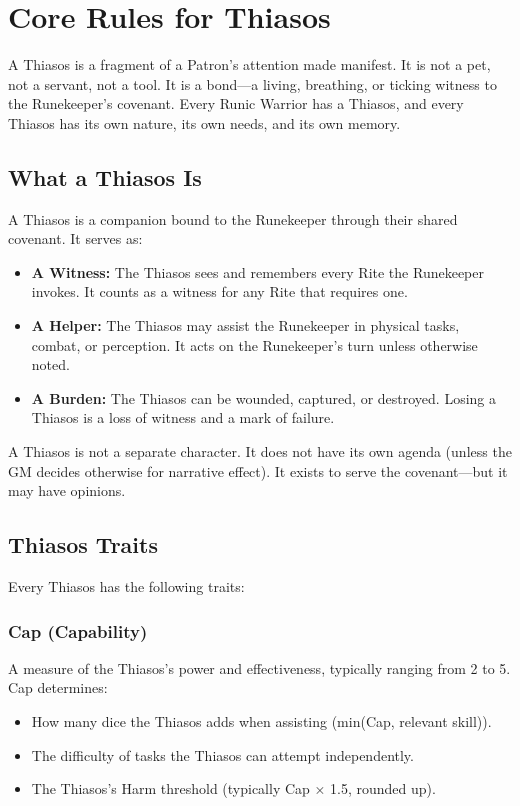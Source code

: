 \section{Core Rules for Thiasos}

A Thiasos is a fragment of a Patron's attention made manifest. It is not a pet, not a servant, not a tool. It is a bond—a living, breathing, or ticking witness to the Runekeeper's covenant. Every Runic Warrior has a Thiasos, and every Thiasos has its own nature, its own needs, and its own memory.

\subsection{What a Thiasos Is}

A Thiasos is a companion bound to the Runekeeper through their shared covenant. It serves as:

\begin{itemize}
\item \textbf{A Witness:} The Thiasos sees and remembers every Rite the Runekeeper invokes. It counts as a witness for any Rite that requires one.
\item \textbf{A Helper:} The Thiasos may assist the Runekeeper in physical tasks, combat, or perception. It acts on the Runekeeper's turn unless otherwise noted.
\item \textbf{A Burden:} The Thiasos can be wounded, captured, or destroyed. Losing a Thiasos is a loss of witness and a mark of failure.
\end{itemize}

A Thiasos is not a separate character. It does not have its own agenda (unless the GM decides otherwise for narrative effect). It exists to serve the covenant—but it may have opinions.

\subsection{Thiasos Traits}

Every Thiasos has the following traits:

\subsubsection{Cap (Capability)}

A measure of the Thiasos's power and effectiveness, typically ranging from 2 to 5. Cap determines:

\begin{itemize}
\item How many dice the Thiasos adds when assisting (min(Cap, relevant skill)).
\item The difficulty of tasks the Thiasos can attempt independently.
\item The Thiasos's Harm threshold (typically Cap × 1.5, rounded up).
\end{itemize}

